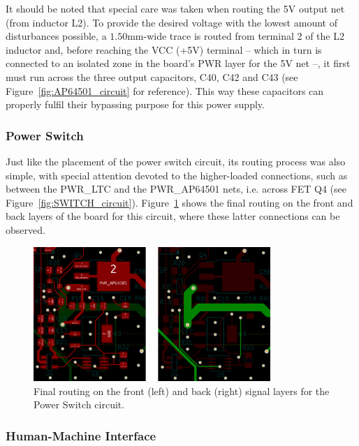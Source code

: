 It should be noted that special care was taken when routing the 5V output net (from inductor L2). To provide the desired voltage with the lowest amount of disturbances possible, a $1.50$mm-wide trace is routed from terminal 2 of the L2 inductor and, before reaching the VCC (+5V) terminal -- which in turn is connected to an isolated zone in the board's PWR layer for the 5V net --, it first must run across the three output capacitors, C40, C42 and C43 (see Figure~\ref{fig:AP64501_circuit} for reference). This way these capacitors can properly fulfil their bypassing purpose for this power supply.


\subsubsection{Power Switch}\label{sec:525_PowerSwitch}

Just like the placement of the power switch circuit, its routing process was also simple, with special attention devoted to the higher-loaded connections, such as between the PWR\_LTC and the PWR\_AP64501 nets, i.e. across FET Q4 (see Figure~\ref{fig:SWITCH_circuit}). Figure~\ref{fig:4_routing_Switch_FCu_BCu} shows the final routing on the front and back layers of the board for this circuit, where these latter connections can be observed.

\begin{figure}[h]
	\centering
	\includegraphics[width=0.8\textwidth]{Chapters/Figures/chapter5/4_routing_Switch_FCu_BCu.png}
	\caption{Final routing on the front (left) and back (right) signal layers for the Power Switch circuit.}
	\label{fig:4_routing_Switch_FCu_BCu}
\end{figure}


\subsubsection{Human-Machine Interface}\label{sec:526_HMI}

